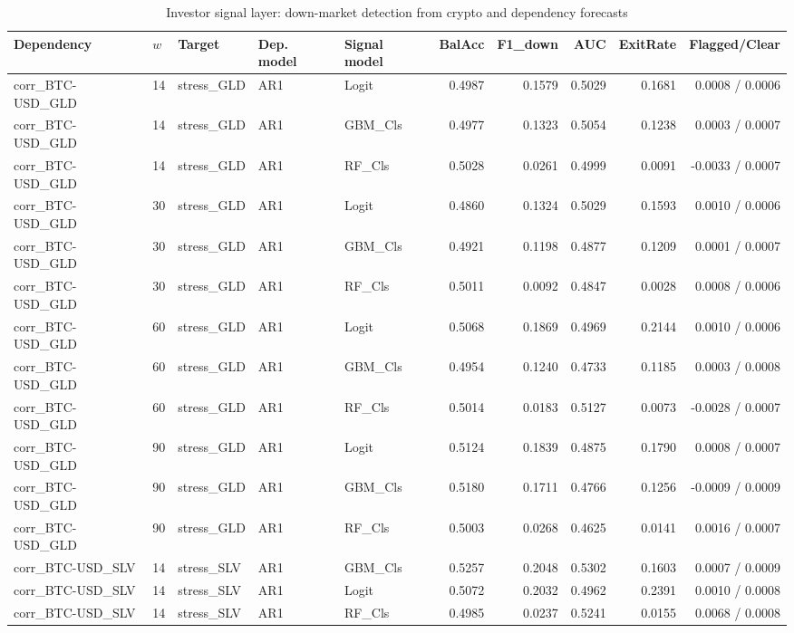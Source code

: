 \begin{table}[H]
\centering
\small
\caption{Investor signal layer: down-market detection from crypto and dependency forecasts}
\label{tab:signal_metrics}
\begin{tabular}{lllllrrrrr}
\toprule
Dependency & $w$ & Target & Dep. model & Signal model & BalAcc & F1_down & AUC & ExitRate & Flagged/Clear \\
\midrule
corr_BTC-USD_GLD & 14 & stress_GLD & AR1 & Logit & 0.4987 & 0.1579 & 0.5029 & 0.1681 & 0.0008 / 0.0006 \\
corr_BTC-USD_GLD & 14 & stress_GLD & AR1 & GBM_Cls & 0.4977 & 0.1323 & 0.5054 & 0.1238 & 0.0003 / 0.0007 \\
corr_BTC-USD_GLD & 14 & stress_GLD & AR1 & RF_Cls & 0.5028 & 0.0261 & 0.4999 & 0.0091 & -0.0033 / 0.0007 \\
corr_BTC-USD_GLD & 30 & stress_GLD & AR1 & Logit & 0.4860 & 0.1324 & 0.5029 & 0.1593 & 0.0010 / 0.0006 \\
corr_BTC-USD_GLD & 30 & stress_GLD & AR1 & GBM_Cls & 0.4921 & 0.1198 & 0.4877 & 0.1209 & 0.0001 / 0.0007 \\
corr_BTC-USD_GLD & 30 & stress_GLD & AR1 & RF_Cls & 0.5011 & 0.0092 & 0.4847 & 0.0028 & 0.0008 / 0.0006 \\
corr_BTC-USD_GLD & 60 & stress_GLD & AR1 & Logit & 0.5068 & 0.1869 & 0.4969 & 0.2144 & 0.0010 / 0.0006 \\
corr_BTC-USD_GLD & 60 & stress_GLD & AR1 & GBM_Cls & 0.4954 & 0.1240 & 0.4733 & 0.1185 & 0.0003 / 0.0008 \\
corr_BTC-USD_GLD & 60 & stress_GLD & AR1 & RF_Cls & 0.5014 & 0.0183 & 0.5127 & 0.0073 & -0.0028 / 0.0007 \\
corr_BTC-USD_GLD & 90 & stress_GLD & AR1 & Logit & 0.5124 & 0.1839 & 0.4875 & 0.1790 & 0.0008 / 0.0007 \\
corr_BTC-USD_GLD & 90 & stress_GLD & AR1 & GBM_Cls & 0.5180 & 0.1711 & 0.4766 & 0.1256 & -0.0009 / 0.0009 \\
corr_BTC-USD_GLD & 90 & stress_GLD & AR1 & RF_Cls & 0.5003 & 0.0268 & 0.4625 & 0.0141 & 0.0016 / 0.0007 \\
corr_BTC-USD_SLV & 14 & stress_SLV & AR1 & GBM_Cls & 0.5257 & 0.2048 & 0.5302 & 0.1603 & 0.0007 / 0.0009 \\
corr_BTC-USD_SLV & 14 & stress_SLV & AR1 & Logit & 0.5072 & 0.2032 & 0.4962 & 0.2391 & 0.0010 / 0.0008 \\
corr_BTC-USD_SLV & 14 & stress_SLV & AR1 & RF_Cls & 0.4985 & 0.0237 & 0.5241 & 0.0155 & 0.0068 / 0.0008 \\

\end{tabular}
\end{table}
